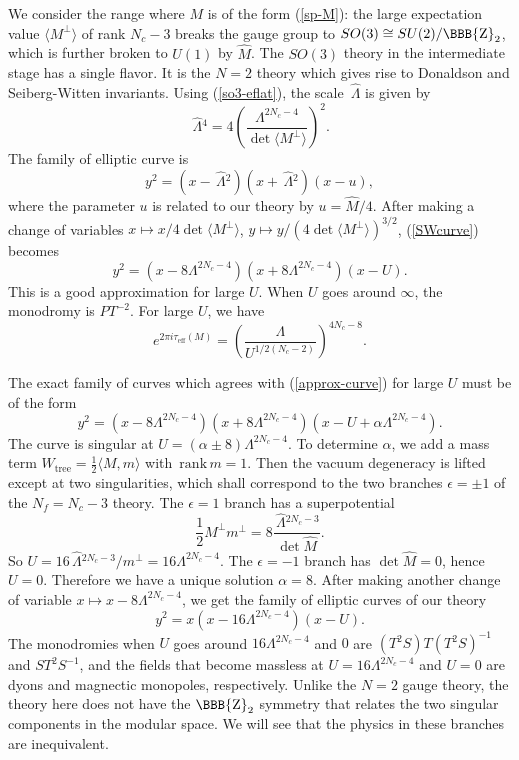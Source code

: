 \documentclass[lecture]{qft-l}
\newcommand{\al}{\alpha}
\newcommand{\eps}{\epsilon}
\newcommand{\Lam}{\varLambda}
\newcommand{\ZZ}{{\mbox{\BBB{Z}}}}
\newcommand{\bra}{\langle}
\newcommand{\ket}{\rangle}
\newcommand{\inv}[1]{\frac{1}{#1}}
\newcommand{\hf}{{\textstyle \inv{2}}}
\newcommand{\e}[1]{e^{{#1}}}
\newcommand{\ii}{i}
\newcommand{\rank}{\mathrm{\,rank\,}}
\newcommand{\tree}{_\mathrm{tree}}
\newcommand{\hLam}{\,\hat{\!\Lam}{}}
\newcommand{\hM}{\hat{M}{}}
\newcommand{\Mperp}{\bra M^\perp\ket}
\newcommand{\eff}{_\mathrm{eff}}
\begin{document}
We consider the range where $M$ is of the form (\ref{sp-M}):
the large expectation value $\Mperp$ of rank $N_c-3$ breaks the gauge group
to $SO(3)\cong SU(2)/\ZZ_2$, which is further broken to $U(1)$ by $\hM$.
The $SO(3)$ theory in the intermediate stage has a single flavor.
It is the $N=2$ theory which gives rise to Donaldson and Seiberg-Witten
invariants.
Using (\ref{so3-eflat}), the scale $\hLam$ is given by
	\begin{equation}
\hLam^4=4\left(\frac{\Lam^{2N_c-4}}{\det\Mperp}\right)^2.
	\end{equation}
The family of elliptic curve is
	\begin{equation}\label{SWcurve}
y^2=(x-\hLam^2)(x+\hLam^2)(x-u),
	\end{equation}
where the parameter $u$ is related to our theory by $u=\hM/4$.
After making a change of variables $x\mapsto x/4\det\Mperp$,
$y\mapsto y/(4\det\Mperp)^{3/2}$, (\ref{SWcurve}) becomes
	\begin{equation}
y^2=(x-8\Lam^{2N_c-4})(x+8\Lam^{2N_c-4})(x-U).
	\end{equation}
This is a good approximation for large $U$.
When $U$ goes around $\infty$, the monodromy is $PT^{-2}$.
For large $U$, we have
	\begin{equation}\label{approx-curve}
\e{2\pi\ii\tau\eff(M)}=\left(\frac{\Lam}{U^{1/2(N_c-2)}}\right)^{4N_c-8}.
	\end{equation}

The exact family of curves which agrees with (\ref{approx-curve}) for
large $U$ must be of the form
	\begin{equation}
y^2=(x-8\Lam^{2N_c-4})(x+8\Lam^{2N_c-4})(x-U+\al\Lam^{2N_c-4}).
	\end{equation}
The curve is singular at $U=(\al\pm8)\Lam^{2N_c-4}$.
To determine $\al$, we add a mass term $W\tree=\hf\bra M,m\ket$ with 
$\rank m=1$.
Then the vacuum degeneracy is lifted except at two singularities, which 
shall correspond to the two branches $\eps=\pm1$ of the $N_f=N_c-3$ theory.
The $\eps=1$ branch has a superpotential
	\begin{equation}\label{so2-Wm}
\hf M^\perp m^\perp=8\frac{\hLam^{2N_c-3}}{\det\hM}.
	\end{equation}
So $U=16\hLam^{2N_c-3}/m^\perp=16\Lam^{2N_c-4}$.
The $\eps=-1$ branch has $\det\hM=0$, hence $U=0$.
Therefore we have a unique solution $\al=8$.
After making another change of variable $x\mapsto x-8\Lam^{2N_c-4}$, we get
the family of elliptic curves of our theory
	\begin{equation}
y^2=x(x-16\Lam^{2N_c-4})(x-U).
	\end{equation}
The monodromies when $U$ goes around $16\Lam^{2N_c-4}$ and $0$ are
$(T^2S)T(T^2S)^{-1}$ and $ST^2S^{-1}$, 
and the fields that become massless at $U=16\Lam^{2N_c-4}$ and $U=0$
are dyons and magnectic monopoles, respectively.
Unlike the $N=2$ gauge theory, the theory here does not have the $\ZZ_2$
symmetry that relates the two singular components in the modular space.
We will see that the physics in these branches are inequivalent.
\end{document}
